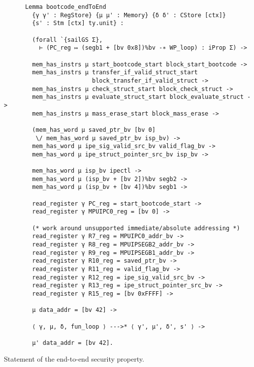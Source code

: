 \begin{listing}
  \begin{verbatim}
      Lemma bootcode_endToEnd
        {γ γ' : RegStore} {μ μ' : Memory} {δ δ' : CStore [ctx]}
        {s' : Stm [ctx] ty.unit} :

        (forall `{sailGS Σ},
          ⊢ (PC_reg ↦ (segb1 + [bv 0x8])%bv -∗ WP_loop) : iProp Σ) ->

        mem_has_instrs μ start_bootcode_start block_start_bootcode ->
        mem_has_instrs μ transfer_if_valid_struct_start
                         block_transfer_if_valid_struct ->
        mem_has_instrs μ check_struct_start block_check_struct ->
        mem_has_instrs μ evaluate_struct_start block_evaluate_struct ->
        mem_has_instrs μ mass_erase_start block_mass_erase ->

        (mem_has_word μ saved_ptr_bv [bv 0]
         \/ mem_has_word μ saved_ptr_bv isp_bv) ->
        mem_has_word μ ipe_sig_valid_src_bv valid_flag_bv ->
        mem_has_word μ ipe_struct_pointer_src_bv isp_bv ->

        mem_has_word μ isp_bv ipectl ->
        mem_has_word μ (isp_bv + [bv 2])%bv segb2 ->
        mem_has_word μ (isp_bv + [bv 4])%bv segb1 ->

        read_register γ PC_reg = start_bootcode_start ->
        read_register γ MPUIPC0_reg = [bv 0] ->

        (* work around unsupported immediate/absolute addressing *)
        read_register γ R7_reg = MPUIPC0_addr_bv ->
        read_register γ R8_reg = MPUIPSEGB2_addr_bv ->
        read_register γ R9_reg = MPUIPSEGB1_addr_bv ->
        read_register γ R10_reg = saved_ptr_bv ->
        read_register γ R11_reg = valid_flag_bv ->
        read_register γ R12_reg = ipe_sig_valid_src_bv ->
        read_register γ R13_reg = ipe_struct_pointer_src_bv ->
        read_register γ R15_reg = [bv 0xFFFF] ->

        μ data_addr = [bv 42] ->

        ⟨ γ, μ, δ, fun_loop ⟩ --->* ⟨ γ', μ', δ', s' ⟩ ->

        μ' data_addr = [bv 42].
  \end{verbatim}
  \caption{Statement of the end-to-end security property.}
  \label{lst:e2e}
\end{listing}

